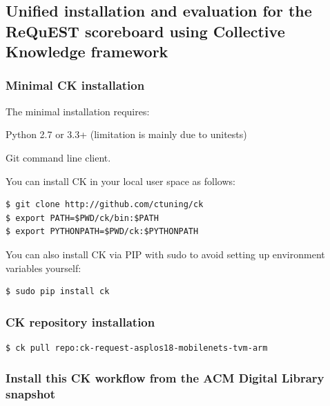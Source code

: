 \documentclass[sigconf]{acmart}
\newenvironment{packed_itemize}{
\begin{itemize}
  \setlength{\itemsep}{1pt}
  \setlength{\parskip}{0pt}
  \setlength{\parsep}{0pt}
}{\end{itemize}}
\begin{document}

\subsection{Unified installation and evaluation for the ReQuEST scoreboard using Collective Knowledge framework}

\subsubsection{Minimal CK installation}

The minimal installation requires:

\begin{packed_itemize}
 \item Python 2.7 or 3.3+ (limitation is mainly due to unitests)
 \item Git command line client.
\end{packed_itemize}

You can install CK in your local user space as follows:

\begin{verbatim}
$ git clone http://github.com/ctuning/ck
$ export PATH=$PWD/ck/bin:$PATH
$ export PYTHONPATH=$PWD/ck:$PYTHONPATH
\end{verbatim}

You can also install CK via PIP with sudo to avoid setting up environment variables yourself:

\begin{verbatim}
$ sudo pip install ck
\end{verbatim}

\subsubsection{CK repository installation}

\begin{verbatim}
$ ck pull repo:ck-request-asplos18-mobilenets-tvm-arm
\end{verbatim}

\subsubsection{Install this CK workflow from the ACM Digital Library snapshot}
\end{document}
